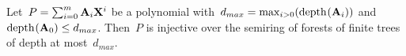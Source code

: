 		\begin{proposition}\label{prop:injDesFinis}
	        Let~$P = \sum_{i=0}^{m} \forest{A}_i \forest{X}^i$ be a polynomial with~$d_{max} = \max_{i > 0}(\depth{\forest{A}_i)}$ and~$\depth{\forest{A}_0} \le d_{max}$. Then~$P$ is injective over the semiring of forests of finite trees of depth at most~$d_{max}$. 
	        
		\end{proposition}
		
